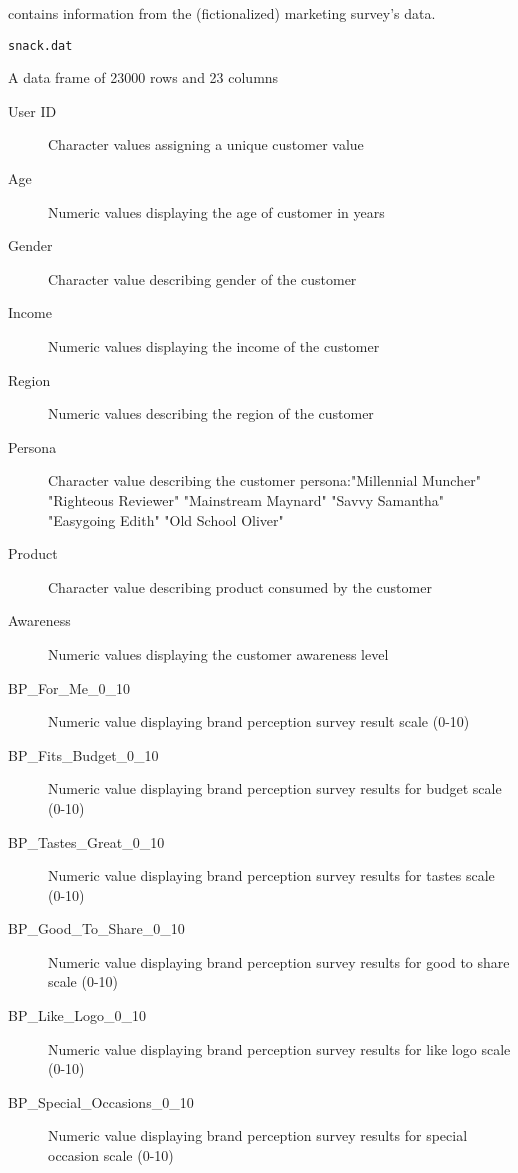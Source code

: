 \documentclass[a4paper]{book}
\begin{document}
%
\begin{Description}\relax
contains information from the (fictionalized) marketing survey’s data.
\end{Description}
%
\begin{Usage}
\begin{verbatim}
snack.dat
\end{verbatim}
\end{Usage}
%
\begin{Format}
A data frame of 23000 rows and 23 columns
\begin{description}

\item[User ID] Character values assigning a unique customer value
\item[Age] Numeric values displaying the age of customer in years
\item[Gender] Character value describing gender of the customer
\item[Income] Numeric values displaying the income of the customer
\item[Region] Numeric values describing the region of the customer
\item[Persona] Character value describing the customer persona:"Millennial Muncher" "Righteous Reviewer" "Mainstream Maynard" "Savvy Samantha" "Easygoing Edith" "Old School Oliver"
\item[Product] Character value describing product consumed by the customer
\item[Awareness] Numeric values displaying the customer awareness level
\item[BP\_For\_Me\_0\_10] Numeric value displaying brand perception survey result scale (0-10)
\item[BP\_Fits\_Budget\_0\_10] Numeric value displaying brand perception survey results for budget scale (0-10)
\item[BP\_Tastes\_Great\_0\_10] Numeric value displaying brand perception survey results for tastes scale (0-10)
\item[BP\_Good\_To\_Share\_0\_10] Numeric value displaying brand perception survey results for good to share scale (0-10)
\item[BP\_Like\_Logo\_0\_10] Numeric value displaying brand perception survey results for like logo scale (0-10)
\item[BP\_Special\_Occasions\_0\_10] Numeric value displaying brand perception survey results for special occasion scale (0-10)

\end{description}
\end{Format}
\end{document}
